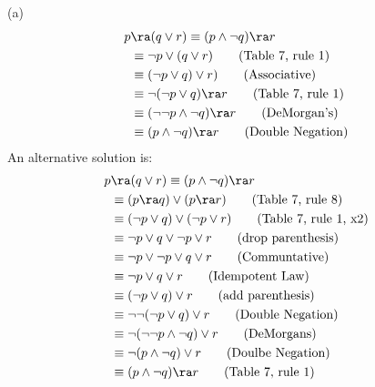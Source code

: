 \begin{questions}
    \begin{solution}
    
    (a)
    \begin{align*}
        p &\ra (q \vee r) \equiv (p \wedge \neg q) \ra r \\
            & \equiv \neg p \vee (q \vee r) \tag{Table 7, rule 1} \\
            & \equiv (\neg p \vee q) \vee r) \tag{Associative} \\
            & \equiv \neg (\neg p \vee q) \ra r \tag{Table 7, rule 1} \\
            & \equiv (\neg \neg p \wedge \neg q) \ra r \tag{DeMorgan's} \\
            & \equiv (p \wedge \neg q) \ra r \tag{Double Negation} 
    \end{align*}
An alternative solution is:
    \begin{align*}
        p &\ra (q \vee r) \equiv (p \wedge \neg q) \ra r \\
        & \equiv (p \ra q) \vee (p \ra r) \tag{Table 7, rule 8} \\
        & \equiv (\neg p \vee q) \vee (\neg p \vee r) \tag{Table 7, rule 1, x2} \\
        & \equiv \neg p \vee q \vee \neg p \vee r \tag{drop parenthesis} \\
        & \equiv \neg p \vee \neg p \vee q \vee r \tag{Communtative} \\
        & \equiv \neg p \vee q \vee r \tag{Idempotent Law} \\
        & \equiv (\neg p \vee q) \vee r \tag{add parenthesis} \\
        & \equiv \neg \neg (\neg p \vee q) \vee r \tag{Double Negation} \\
        & \equiv \neg (\neg \neg p \wedge \neg q) \vee r \tag{DeMorgans} \\
        & \equiv \neg (p \wedge \neg q) \vee r \tag{Doulbe Negation} \\
        & \equiv (p \wedge \neg q) \ra r \tag{Table 7, rule 1}
    \end{align*}


\end{solution}
\end{questions}
